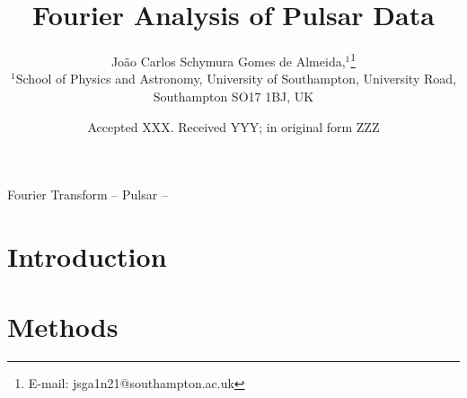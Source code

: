 \documentclass[fleqn,usenatbib]{mnras}
\title[Fourier Analysis of Pulsar Data]{Fourier Analysis of Pulsar Data}
\author[J. C. Schymura Gomes de Almeida]{
João Carlos Schymura Gomes de Almeida,$^{1}$\thanks{E-mail: jsga1n21@southampton.ac.uk }
\\
$^{1}$School of Physics and Astronomy, University of Southampton, University Road, Southampton SO17 1BJ, UK\\
}
\date{Accepted XXX. Received YYY; in original form ZZZ}
\begin{document}
\label{firstpage}
\pagerange{\pageref{firstpage}--\pageref{lastpage}}
\maketitle

\begin{abstract}




\end{abstract}

\begin{keywords}
Fourier Transform -- Pulsar -- 
\end{keywords}



    


\section{Introduction}

\begin{comment}
    Annealing is the process of slowly cooling a physical system in order to obtain states with globally minimum energy. By simulating such a process, near globally-minimum-cost solutions can be found for very large optimization problems \cite{hajek1985}
\end{comment}





\section{Methods}
\label{Methods}
\end{document}

